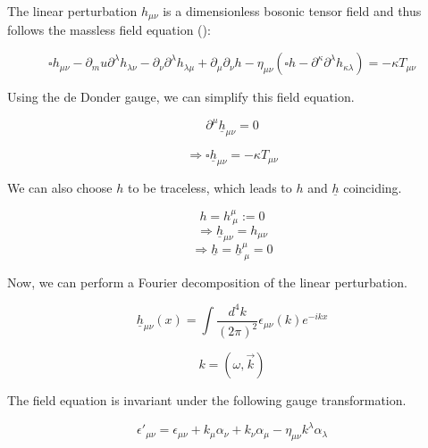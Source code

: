 The linear perturbation $h_{\mu\nu}$ is a dimensionless bosonic tensor field and thus follows the massless field equation (\cite{van_holten_gravitational_2019}):

\begin{equation}
    \square h_{\mu\nu} -\partial_mu \partial^\lambda h_{\lambda\nu}-\partial_\nu\partial^\lambda h_{\lambda\mu}+\partial_\mu \partial_\nu h - \eta_{\mu\nu}(\square h-\partial^\kappa \partial^\lambda h_{\kappa\lambda})=-\kappa T_{\mu\nu}
\end{equation}

Using the de Donder gauge, we can simplify this field equation.

\begin{equation}
    \partial^\mu \underline{h}_{\mu\nu}=0
\end{equation}

\begin{equation}
    \Rightarrow \square \underline{h}_{\mu\nu}=-\kappa T_{\mu\nu}
\end{equation}

We can also choose $h$ to be traceless, which leads to $h$ and $\underline{h}$ coinciding.

\begin{equation}
    h = h_{\ \mu}^\mu := 0
\end{equation}
\begin{equation}
    \Rightarrow \underline{h}_{\mu\nu}=h_{\mu\nu}
\end{equation}
\begin{equation}
    \Rightarrow \underline{h} = \underline{h}_{\ \mu}^\mu =0
\end{equation}

Now, we can perform a Fourier decomposition of the linear perturbation.

\begin{equation}
    \underline{h}_{\mu\nu}(x) = \int \frac{d^4k}{(2\pi)^2} \epsilon_{\mu\nu}(k)e^{-ikx}
\end{equation}

\begin{equation}
    k=(\omega, \vec{k})
\end{equation}

The field equation is invariant under the following gauge transformation. 

\begin{equation}
    \epsilon '_{\mu\nu}=\epsilon_{\mu\nu}+k_\mu \alpha_\nu + k_\nu \alpha_\mu - \eta_{\mu\nu}k^\lambda \alpha_\lambda
    \label{epsilon_prime_gauge}
\end{equation}


